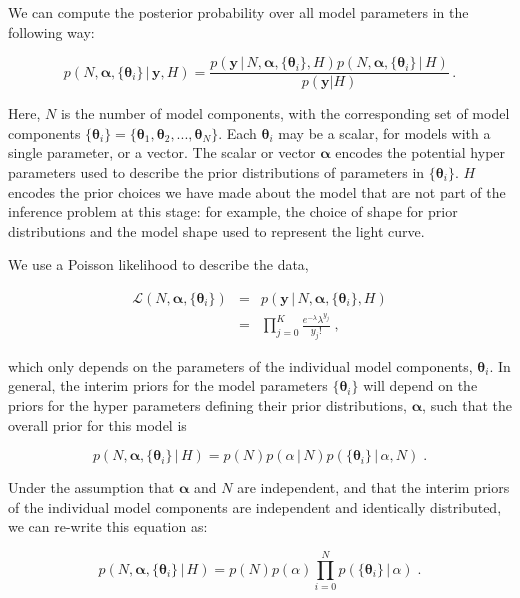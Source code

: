 \documentclass[12pt]{emulateapj}
\newcommand{\given}{\,|\,}
\newcommand{\counts}{y}
\newcommand{\likelihood}{{\mathcal L}}
\begin{document}
We can compute the posterior probability over all model parameters in the following way:

\begin{equation}
p(N, \bm{\alpha},\{\bm{\theta}_i \} \given \bm{\counts}, H) = \frac{p(\bm{\counts} \given N, \bm{\alpha}, \{\bm{\theta}_i \}, H) p(N, \bm{\alpha}, \{\bm{\theta}_i \} \given H)}{p(\bm{\counts} | H)} \, .
\end{equation}

Here, $N$ is the number of model components, with the corresponding set of model components $\{\bm{\theta}_i\} = \{ \bm{\theta}_1, \bm{\theta}_2, ..., \bm{\theta}_N \}$. Each $\bm{\theta}_i$ may be a scalar, for models with a single parameter, or a vector.
The scalar or vector $\bm{\alpha}$ encodes the potential hyper parameters used to describe the prior distributions of parameters in $\{\bm{\theta}_i\}$. $H$ encodes the prior choices we have
made about the model that are not part of the inference problem at this stage: for example, the choice of shape for prior distributions and the model shape used to represent the light curve.

We use a Poisson likelihood to describe the data,

\begin{eqnarray}
\likelihood(N, \bm{\alpha}, \{\bm{\theta}_i \}) & = & p(\bm{\counts} \given N, \bm{\alpha}, \{\bm{\theta}_i \}, H) \\ \nonumber
 &= & \prod\limits_{j=0}^{K}{ \frac{e^{-\lambda} \lambda^{y_j} }{y_j! }} \; ,
\end{eqnarray}

which only depends on the parameters of the individual model components, $\bm{\theta}_i$. In general, the interim priors for the model 
parameters $\{\bm{\theta}_i\}$ will depend on the priors for the hyper parameters defining their prior distributions, $\bm{\alpha}$, such that the
overall prior for this model is

\begin{equation}
p(N, \bm{\alpha}, \{\bm{\theta}_i \} \given H) = p(N)p(\alpha\given N)p(\{\bm{\theta}_i\}\given \alpha, N) \; .
\end{equation}

Under the assumption that $\bm{\alpha}$ and $N$ are independent, and that the interim priors of the individual model components are
independent and identically distributed, we can re-write this equation as:

\begin{equation}
p(N, \bm{\alpha}, \{\bm{\theta}_i \} \given H) = p(N)p(\alpha) \prod\limits_{i=0}^{N}  p(\{\bm{\theta}_i\}\given \alpha) \; .
\end{equation}
\end{document}
